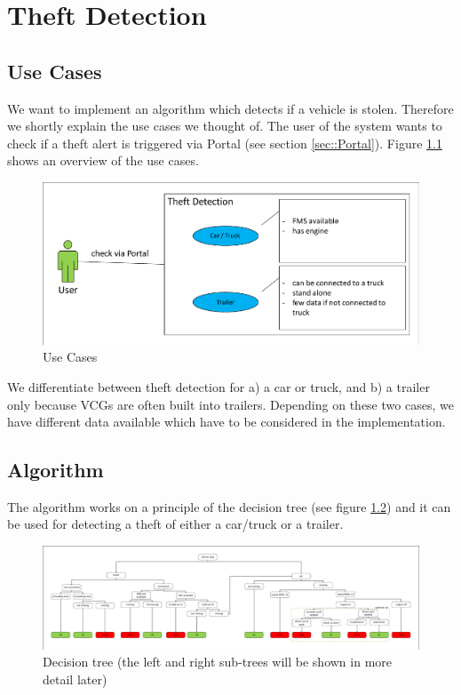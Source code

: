 \chapter{Theft Detection}

\section{Use Cases}

We want to implement an algorithm which detects if a vehicle is stolen. Therefore we shortly explain the use cases we thought of. The user of the system wants to check if a theft alert is triggered via Portal (see section \ref{sec::Portal}). 
Figure \ref{fig::useCase} shows an overview of the use cases.

\begin{figure} [h]
    \includegraphics[clip, trim=0.1cm 0.1cm 0.1cm 0.1cm, width=1\textwidth]{src/pic/UseCase}
    \caption{Use Cases}
    \label{fig::useCase}
\end{figure}

We differentiate between theft detection for a) a car or truck, and b) a trailer only because VCGs are often built into trailers. Depending on these two cases, we have different data available which have to be considered in the implementation.

\clearpage

\section{Algorithm}
The algorithm works on a principle of the decision tree (see figure \ref{fig::decisionTree}) and it can be used for detecting a theft of either a car/truck or a trailer.


\begin{figure} [h]
    \includegraphics[clip, trim=0.1cm 0.1cm 0.1cm 0.1cm, width=1\textwidth]{src/pic/DecisionTree}
    \caption{Decision tree (the left and right sub-trees will be shown in more detail later)}
    \label{fig::decisionTree}
\end{figure}

